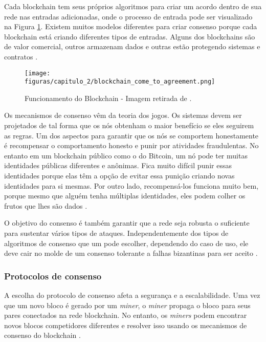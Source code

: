        Cada blockchain tem seus próprios algoritmos para criar um acordo dentro de sua rede nas entradas adicionadas, onde o processo de entrada pode ser visualizado na Figura \ref{fig:blockchain_work_dummies}. Existem muitos modelos diferentes para criar consenso porque cada blockchain está criando diferentes tipos de entradas. Alguns dos blockchains são de valor comercial, outros armazenam dados e outras estão protegendo sistemas e contratos \cite{blockchain_for_dummies}.
        
        
                \begin{figure}[h]
                     \centering
                     \texttt{[image: figuras/capitulo\_2/blockchain\_come\_to\_agreement.png]}
                     \caption{Funcionamento do Blockchain - Imagem retirada de \cite{blockchain_for_dummies}.}
                     \label{fig:blockchain_work_dummies}
                \end{figure}
        
        Os mecanismos de consenso vêm da teoria dos jogos. Os sistemas devem ser projetados de tal forma que os nós obtenham o maior benefício se eles seguirem as regras. Um dos aspectos para garantir que os nós se comportem honestamente é recompensar o comportamento honesto e punir por atividades fraudulentas. No entanto em um blockchain público como o do Bitcoin, um nó pode ter muitas identidades públicas diferentes e anônimas. Fica muito difícil punir essas identidades porque elas têm a opção de evitar essa punição criando novas identidades para si mesmas. Por outro lado, recompensá-los funciona muito bem, porque mesmo que alguém tenha múltiplas identidades, eles podem colher os frutos que lhes são dados \cite{beginnig_blockchain_bikramaditya}.
        
        O objetivo do consenso é também garantir que a rede seja robusta o suficiente para sustentar vários tipos de ataques. Independentemente dos tipos de algoritmos de consenso que um pode escolher, dependendo do caso de uso, ele deve cair no molde de um consenso tolerante a falhas bizantinas para ser aceito \cite{beginnig_blockchain_bikramaditya}.
        
        
        \subsubsection{Protocolos de consenso}

            A escolha do protocolo de consenso afeta a segurança e a escalabilidade. Uma vez que um novo bloco é gerado por um \textit{miner}, o \textit{miner} propaga o bloco para seus pares conectados na rede blockchain. No entanto, os \textit{miners} podem encontrar novos blocos competidores diferentes e resolver isso usando os mecanismos de consenso do blockchain \cite{architecture_for_blockchain}.
            
